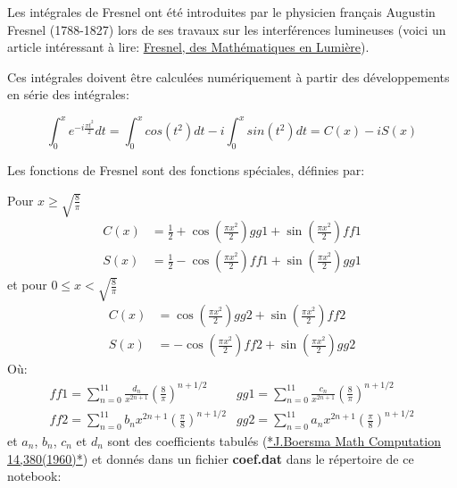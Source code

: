 \documentclass[%
oneside,                 %
final,                   %
10pt,french]{article}
\newenvironment{doconceexercise}{}{}
\newcounter{doconceexercisecounter}
\begin{document}
\begin{doconceexercise}



Les intégrales de Fresnel ont été introduites par le physicien français Augustin Fresnel (1788-1827) lors de ses travaux sur les interférences lumineuses (voici un article intéressant à lire: \href{{http://www.mathouriste.eu/Fresnel/Fresnel.html}}{Fresnel, des Mathématiques en Lumière}).

Ces intégrales doivent être calculées numériquement à partir des développements en série des intégrales:

$$\int_{0}^{x} e^{-i\frac{\pi t^{2}}{2}} dt = \int_{0}^{x} cos(t^2) dt -i \int_{0}^{x} sin(t^2) dt= C(x) -i S(x)$$

Les fonctions de Fresnel sont des fonctions spéciales, définies par:

Pour $x \geq \sqrt{\frac{8}{\pi}}$
\begin{equation*}
\begin{aligned}
C(x) &= \frac{1}{2} + \cos\left(\frac{\pi x^{2}}{2}\right) gg1 + \sin\left(\frac{\pi x^{2}}{2}\right) ff1\\
S(x) &=  \frac{1}{2} - \cos\left(\frac{\pi x^{2}}{2}\right) ff1 + \sin\left(\frac{\pi x^{2}}{2}\right) gg1
\end{aligned}
\end{equation*}
et pour $0 \leq x < \sqrt{\frac{8}{\pi}}$
\begin{equation*}
\begin{aligned}
C(x) &= \cos\left(\frac{\pi x^{2}}{2}\right) gg2 + \sin\left(\frac{\pi x^{2}}{2}\right) ff2 \\
S(x) &= - \cos\left(\frac{\pi x^{2}}{2}\right) ff2 + \sin\left(\frac{\pi x^{2}}{2}\right) gg2
\end{aligned}
\end{equation*}
Où:
\begin{equation*}
\begin{aligned}
ff1 = \sum\limits_{n=0}^{11} \frac{d_{n}}{x^{2n+1}}\left(\frac{8}{\pi}\right)^{n+1/2} & gg1 = \sum\limits_{n=0}^{11} \frac{c_{n}}{x^{2n+1}}\left(\frac{8}{\pi}\right)^{n+1/2}\\
ff2 = \sum\limits_{n=0}^{11} b_{n}x^{2n+1}\left(\frac{\pi}{8}\right)^{n+1/2} & gg2 = \sum\limits_{n=0}^{11} a_{n}x^{2n+1}\left(\frac{\pi}{8}\right)^{n+1/2}
\end{aligned}
\end{equation*}
et $a_n$, $b_n$, $c_n$ et $d_n$ sont des coefficients tabulés  (\href{{https://www.ams.org/journals/mcom/1960-14-072/S0025-5718-1960-0121973-3/S0025-5718-1960-0121973-3.pdf}}{*J.Boersma Math Computation 14,380(1960)*}) et donnés dans un fichier \textbf{coef.dat} dans le répertoire de ce notebook:


\end{doconceexercise}
\end{document}
